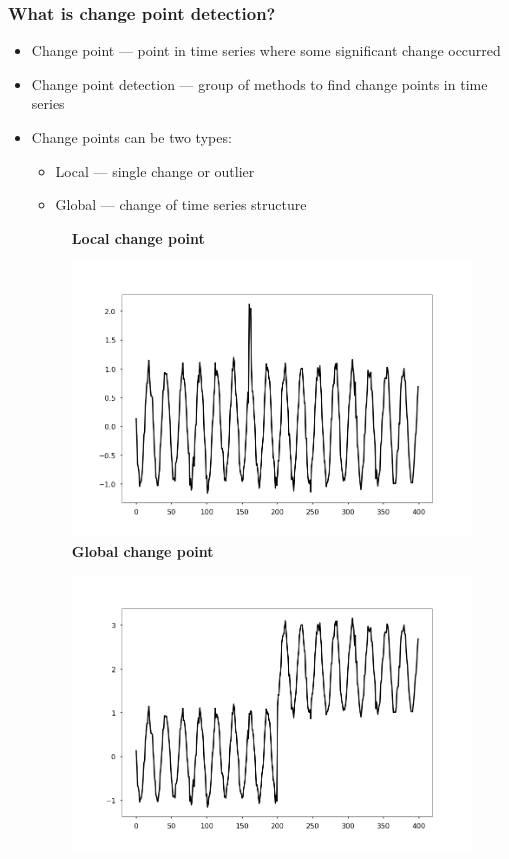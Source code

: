 \documentclass[intlimits, 9pt, unicode]{beamer}
\begin{document}
\begin{frame}
    \frametitle{What is change point detection?}

    \begin{itemize}
    	\item Change point --- point in time series where some significant change occurred
	\item Change point detection --- group of methods to find change points in time series
	\item Change points can be two types:
		\begin{itemize}
			\item Local --- single change or outlier
			\item Global --- change of time series structure 
		\end{itemize}
	\begin{figure}
		\textbf{Local change point}\par\medskip
		\includegraphics[scale=0.10]{images/local_cp}
		\textbf{Global change point}\par\medskip
		\includegraphics[scale=0.10]{images/global_cp}
	\end{figure}
    \end{itemize}
\end{frame}
\end{document}
